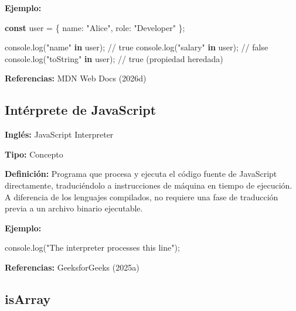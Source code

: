 \documentclass[
  letterpaper,
  DIV=11,
  numbers=noendperiod]{scrreprt}
\newenvironment{Shaded}{\begin{snugshade}}{\end{snugshade}}
\newcommand{\BuiltInTok}[1]{\textcolor[rgb]{0.00,0.23,0.31}{#1}}
\newcommand{\CommentTok}[1]{\textcolor[rgb]{0.37,0.37,0.37}{#1}}
\newcommand{\DataTypeTok}[1]{\textcolor[rgb]{0.68,0.00,0.00}{#1}}
\newcommand{\FunctionTok}[1]{\textcolor[rgb]{0.28,0.35,0.67}{#1}}
\newcommand{\KeywordTok}[1]{\textcolor[rgb]{0.00,0.23,0.31}{\textbf{#1}}}
\newcommand{\NormalTok}[1]{\textcolor[rgb]{0.00,0.23,0.31}{#1}}
\newcommand{\OperatorTok}[1]{\textcolor[rgb]{0.37,0.37,0.37}{#1}}
\newcommand{\StringTok}[1]{\textcolor[rgb]{0.13,0.47,0.30}{#1}}
\let\oldsubsection\subsection
\renewcommand{\subsection}{\phantomsection\oldsubsection}
\begin{document}
\textbf{Ejemplo:}

\begin{Shaded}
\begin{Highlighting}[]
\KeywordTok{const}\NormalTok{ user }\OperatorTok{=}\NormalTok{ \{ }\DataTypeTok{name}\OperatorTok{:} \StringTok{"Alice"}\OperatorTok{,} \DataTypeTok{role}\OperatorTok{:} \StringTok{"Developer"}\NormalTok{ \}}\OperatorTok{;}

\BuiltInTok{console}\OperatorTok{.}\FunctionTok{log}\NormalTok{(}\StringTok{"name"} \KeywordTok{in}\NormalTok{ user)}\OperatorTok{;}   \CommentTok{// true}
\BuiltInTok{console}\OperatorTok{.}\FunctionTok{log}\NormalTok{(}\StringTok{"salary"} \KeywordTok{in}\NormalTok{ user)}\OperatorTok{;} \CommentTok{// false}
\BuiltInTok{console}\OperatorTok{.}\FunctionTok{log}\NormalTok{(}\StringTok{"toString"} \KeywordTok{in}\NormalTok{ user)}\OperatorTok{;} \CommentTok{// true (propiedad heredada)}
\end{Highlighting}
\end{Shaded}

\textbf{Referencias:} MDN Web Docs (2026d)

\subsection*{Intérprete de JavaScript}\label{glos-interpreter}

\textbf{Inglés:} JavaScript Interpreter

\textbf{Tipo:} Concepto

\textbf{Definición:} Programa que procesa y ejecuta el código fuente de
JavaScript directamente, traduciéndolo a instrucciones de máquina en
tiempo de ejecución. A diferencia de los lenguajes compilados, no
requiere una fase de traducción previa a un archivo binario ejecutable.

\textbf{Ejemplo:}

\begin{Shaded}
\begin{Highlighting}[]
\BuiltInTok{console}\OperatorTok{.}\FunctionTok{log}\NormalTok{(}\StringTok{"The interpreter processes this line"}\NormalTok{)}\OperatorTok{;}
\end{Highlighting}
\end{Shaded}

\textbf{Referencias:} GeeksforGeeks (2025a)

\subsection*{isArray}\label{glos-isarray}
\end{document}
